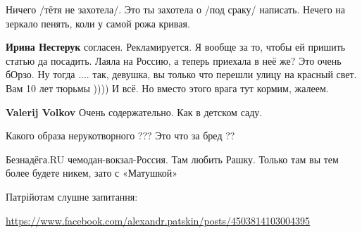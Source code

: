 \begin{itemize}
\begin{itemize}
Ничего /тётя не захотела/.
Это ты захотела о /под сраку/ написать.
Нечего на зеркало пенять, коли у самой рожа кривая.

 
\textbf{Ирина Нестерук} согласен. Рекламируется. Я вообще за то, чтобы ей
пришить статью да посадить. Лаяла на Россию, а теперь приехала в неё же? Это
очень бОрзо. Ну тогда .... так, девушка, вы только что перешли улицу на красный
свет. Вам 10 лет тюрьмы )))) И всё. Но вместо этого врага тут кормим, жалеем.

 
\textbf{Valerij Volkov} Очень содержательно. Как в детском саду.

\end{itemize}

 
Какого образа нерукотворного ??? Это что за бред ??

 
Безнадёга.RU чемодан-вокзал-Россия. Там любить Рашку. Только там вы тем более будете никем, зато с «Матушкой»🙈

 
Патрійотам слушне запитання:

\url{https://www.facebook.com/alexandr.patskin/posts/4503814103004395}


\end{itemize}
